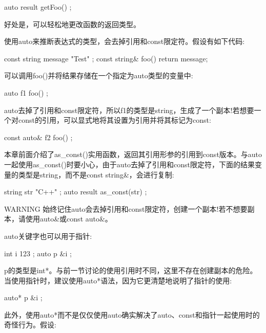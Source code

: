 \begin{cpp}
auto result { getFoo() };
\end{cpp}

好处是，可以轻松地更改函数的返回类型。


使用auto来推断表达式的类型，会去掉引用和const限定符。假设有如下代码:

\begin{cpp}
const string message { "Test" };
const string& foo() { return message; }
\end{cpp}

可以调用foo()并将结果存储在一个指定为auto类型的变量中:

\begin{cpp}
auto f1 { foo() };
\end{cpp}

auto去掉了引用和const限定符，所以f1的类型是string，生成了一个副本!若想要一个对const的引用，可以显式地将其设置为引用并将其标记为const:

\begin{cpp}
const auto& f2 { foo() };
\end{cpp}

本章前面介绍了as\_const()实用函数，返回其引用形参的引用到const版本。与auto一起使用as\_const()时要小心，由于auto去掉了引用和const限定符，下面的结果变量的类型是string，而不是const string\&，会进行复制:

\begin{cpp}
string str { "C++" };
auto result { as_const(str) };
\end{cpp}

\begin{myWarning}{WARNING}
始终记住auto会去掉引用和const限定符，创建一个副本!若不想要副本，请使用auto\&或const auto\&。
\end{myWarning}


auto关键字也可以用于指针:

\begin{cpp}
int i { 123 };
auto p { &i };
\end{cpp}

p的类型是int*。与前一节讨论的使用引用时不同，这里不存在创建副本的危险。当使用指针时，建议使用auto*语法，因为它更清楚地说明了指针的使用:

\begin{cpp}
auto* p { &i };
\end{cpp}

此外，使用auto*而不是仅仅使用auto确实解决了auto、const和指针一起使用时的奇怪行为。假设:

